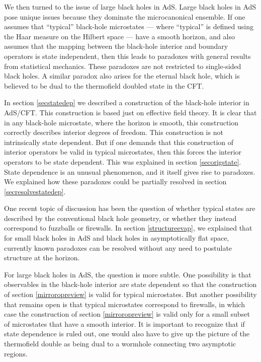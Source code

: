 \documentclass[12pt]{article}
\begin{document}
We then turned to the issue of large black holes in AdS. Large black holes in AdS pose unique issues because they dominate the microcanonical ensemble.
If one assumes that ``typical'' black-hole microstates --- where ``typical'' is defined using the Haar measure on the Hilbert space --- have a smooth horizon, and also assumes that the mapping between the black-hole interior and boundary operators is state independent, then this leads to paradoxes with general results from statistical mechanics. These paradoxes are not restricted to single-sided black holes. A similar paradox also arises for the eternal black hole, which is believed to be dual to the thermofield doubled state in the CFT.

In section \ref{secstatedep} we described a construction of the black-hole interior in AdS/CFT. This construction is based just on effective field theory. It is clear that in any
black-hole microstate, where the horizon is smooth, this construction
correctly describes interior degrees of freedom. This construction is not intrinsically state dependent.  But if one demands that this construction of interior operators be valid in typical microstates, then this forces the interior operators to be state dependent. This was explained in section \ref{secorigstate}. State dependence is an unusual phenomenon, and it itself gives rise to paradoxes. We explained how these paradoxes could be partially resolved in section \ref{secresolvestatedep}.

One recent topic of discussion has been the question of whether
typical states are described by the conventional black hole geometry, or whether they instead correspond to fuzzballs or firewalls. In section \ref{structureevap}, we explained that for small black holes in AdS and black holes in asymptotically flat space, currently known  paradoxes can be resolved without any need to postulate structure at the horizon.

For large black holes in AdS, the question is more subtle. One possibility is that  observables in the black-hole interior are state dependent so that the construction of section \ref{mirroropreview} is valid for typical microstates.  But another possibility that remains open is that typical microstates correspond to firewalls, in which case the construction of section \ref{mirroropreview} is valid only for a small subset of microstates that have a smooth interior. It is important to recognize that if state dependence is ruled out, one would also have to give up the picture of the thermofield double as being dual to a wormhole connecting two asymptotic regions.
\end{document}
